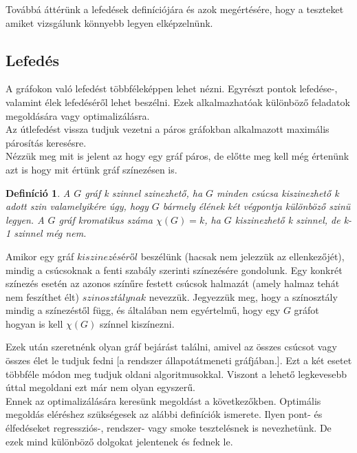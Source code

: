 \documentclass[12pt]{article}
\newtheorem{defin}{Definíció}[section]
\begin{document}
Továbbá áttérünk a lefedések definíciójára és azok megértésére, hogy a teszteket amiket vizsgálunk könnyebb legyen elképzelnünk.\\

\subsection{Lefedés}

A gráfokon való lefedést többféleképpen lehet nézni. Egyrészt pontok lefedése-, valamint élek lefedéséről lehet beszélni. Ezek alkalmazhatóak különböző feladatok megoldására vagy optimalizálásra.\\
Az útlefedést vissza tudjuk vezetni a páros gráfokban alkalmazott maximális párosítás keresésre.\\

Nézzük meg mit is jelent az hogy egy gráf páros, de előtte meg kell még értenünk azt is hogy mit értünk gráf színezésen is.

\begin{defin}
A $G$ gráf k szinnel szinezhető, ha $G$ minden csúcsa kiszinezhető k adott szin valamelyikére úgy, hogy $G$ bármely élének két végpontja különböző szinü legyen. A $G$ gráf kromatikus száma $\chi(G) = k$, ha $G$ kiszinezhető k szinnel, de k-1 szinnel még nem. ~\cite{szam:Fleiner}
\end{defin}

Amikor egy gráf $kiszinezéséről$ beszélünk (hacsak nem jelezzük az ellenkezőjét), mindig a csúcsoknak a fenti szabály szerinti színezésére gondolunk. Egy konkrét színezés esetén az azonos színűre festett csúcsok halmazát (amely halmaz tehát nem feszíthet élt) $szinosztálynak$ nevezzük. Jegyezzük meg, hogy a színosztály mindig a színezéstől függ, és általában nem egyértelmű, hogy egy $G$ gráfot hogyan is kell $\chi(G)$ színnel kiszínezni.

Ezek után szeretnénk olyan gráf bejárást találni, amivel az összes csúcsot vagy összes élet le tudjuk fedni [a rendszer állapotátmeneti gráfjában.].
Ezt a két esetet többféle módon meg tudjuk oldani algoritmusokkal.
Viszont a lehető legkevesebb úttal megoldani ezt már nem olyan egyszerű.\\
Ennek az optimalizálására keresünk megoldást a következőkben.
Optimális megoldás eléréshez szükségesek az alábbi definíciók ismerete.
Ilyen pont- és élfedéseket regressziós-, rendszer- vagy smoke tesztelésnek is nevezhetünk. De ezek mind különböző dolgokat jelentenek és fednek le.\\
\end{document}
